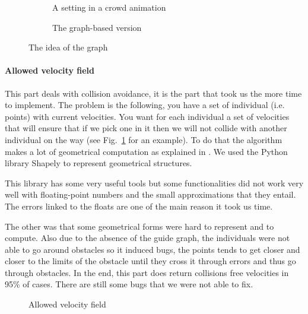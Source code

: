 \begin{figure}[h!]
  \centering
  \begin{subfigure}[t]{0.45\textwidth}
    \scalebox{.4}{}
    \caption{A setting in a crowd animation}
  \end{subfigure} %
  \begin{subfigure}[t]{0.45\textwidth}
    \scalebox{.4}{}
    \caption{The graph-based version}
  \end{subfigure}
  \caption{The idea of the graph}
\end{figure}


\paragraph{Allowed velocity field}

This part deals with collision avoidance, it is the part that
took us the more time to implement. The problem is the following, you
have a set of individual (i.e. points) with current velocities. You
want for each individual a set of velocities that will ensure that if
we pick one in it then we will not collide with another individual on
the way (see Fig.~\ref{fig:avf} for an example). To do that the algorithm
makes a lot of geometrical computation as explained in
\cite{vandenBerg2011}. We used the Python library Shapely to represent
geometrical structures.

This library has some very useful tools but some functionalities did
not work very well with floating-point numbers and the small
approximations that they entail. The errors linked to the floats are
one of the main reason it took us time. 


The other was that some geometrical forms were hard to represent and
to compute.  Also due to the absence of the guide graph, the
individuals were not able to go around obstacles so it induced bugs,
the points tends to get closer and closer to the limits of the
obstacle until they cross it through errors and thus go through
obstacles.  In the end, this part does return collisions free
velocities in 95\% of cases. There are still some bugs that we were
not able to fix.  %


\begin{figure}[h!]
  \centering
  \scalebox{.475}{}
  \caption{Allowed velocity field}
  \label{fig:avf}
\end{figure}



